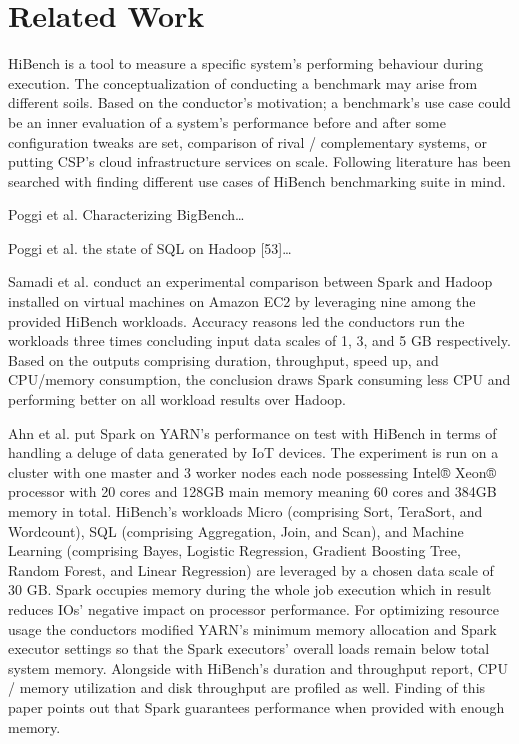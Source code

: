 \documentclass[review]{elsarticle}
\begin{document}
\section{Related Work}
HiBench is a tool to measure a specific system’s performing behaviour during execution. The conceptualization of conducting a benchmark may arise from different soils. Based on the conductor’s motivation; a benchmark’s use case could be an inner evaluation of a system’s performance before and after some configuration tweaks are set, comparison of rival / complementary systems, or putting CSP’s cloud infrastructure services on scale. Following literature has been searched with finding different use cases of HiBench benchmarking suite in mind. 

Poggi et al. \cite{poggi_characterizing_2018} Characterizing BigBench…

Poggi et al. \cite{poggi_state_2016} the state of SQL on Hadoop [53]…

Samadi et al. \cite{samadi_performance_2018} conduct an experimental comparison between Spark and Hadoop installed on virtual machines on Amazon EC2 by leveraging nine among the provided HiBench workloads. Accuracy reasons led the conductors run the workloads three times concluding input data scales of 1, 3, and 5 GB respectively. Based on the outputs comprising duration, throughput, speed up, and CPU/memory consumption, the conclusion draws Spark consuming less CPU and performing better on all workload results over Hadoop. 

Ahn et al. \cite{ahn_performance_2018} put Spark on YARN’s performance on test with HiBench in terms of handling a deluge of data generated by IoT devices. The experiment is run on a cluster with one master and 3 worker nodes each node possessing Intel® Xeon® processor with 20 cores and 128GB main memory meaning 60 cores and 384GB memory in total. HiBench’s workloads Micro (comprising Sort, TeraSort, and Wordcount), SQL (comprising Aggregation, Join, and Scan), and Machine Learning (comprising Bayes, Logistic Regression, Gradient Boosting Tree, Random Forest, and Linear Regression) are leveraged by a chosen data scale of 30 GB. Spark occupies memory during the whole job execution which in result reduces IOs’ negative impact on processor performance. For optimizing resource usage the conductors modified YARN’s minimum memory allocation and Spark executor settings so that the Spark executors’ overall loads remain below total system memory. Alongside with HiBench’s duration and throughput report, CPU / memory utilization and disk throughput are profiled as well. Finding of this paper points out that Spark guarantees performance when provided with enough memory.
\end{document}
